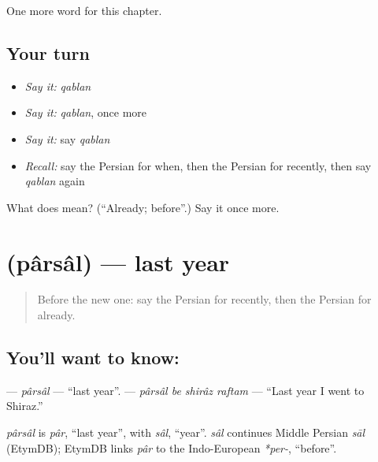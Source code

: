 \begin{grammarlens}[title={What you've built}]
One more word for this chapter.
\end{grammarlens}

\subsection*{Your turn}
\begin{itemize}
\raggedright
  \item \emph{Say it:} \emph{qablan}
  \item \emph{Say it:} \emph{qablan}, once more
  \item \emph{Say it:} say \emph{qablan}
  \item \emph{Recall:} say the Persian for when, then the Persian for recently, then say \emph{qablan} again
\end{itemize}

\begin{tcolorbox}[breakable,colback=teal!4,colframe=teal!35!black,title={Before you move on}]
What does  mean? (\textquotedblleft{}Already; before\textquotedblright{}.) Say it once more.
\end{tcolorbox}
\section[\texorpdfstring{\fa{پارسال} (pârsâl)}{پارسال (pârsâl)}]{ (pârsâl) — last year}

\label{lesson:FA-C137-parsal}



\begin{quote}
Before the new one: say the Persian for recently, then the Persian for already.
\end{quote}

\subsection*{You'll want to know: }
\textbf{} — \emph{pârsâl} — \textquotedblleft{}last year\textquotedblright{}. \textbf{   } — \emph{pârsâl be shirâz raftam} — \textquotedblleft{}Last year I went to Shiraz.\textquotedblright{}

\begin{cousinweb}
\emph{pârsâl} is \emph{pâr}, \textquotedblleft{}last year\textquotedblright{}, with \emph{sâl}, \textquotedblleft{}year\textquotedblright{}. \emph{sâl} continues Middle Persian \emph{sāl} (EtymDB); EtymDB links \emph{pâr} to the Indo-European \emph{*per-}, \textquotedblleft{}before\textquotedblright{}.
\end{cousinweb}

